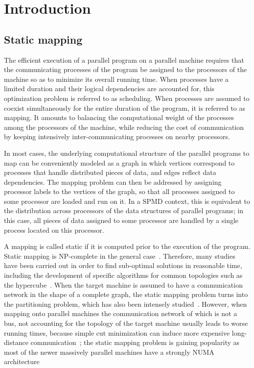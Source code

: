 
\section{Introduction}

\subsection{Static mapping}

The efficient execution of a parallel program on a parallel machine
requires that the communicating processes of the program be assigned
to the processors of the machine so as to minimize its overall running
time.
When processes have a limited duration and their logical dependencies
are accounted for, this optimization problem is referred to as
scheduling.
When processes are assumed to coexist simultaneously for the entire
duration of the program, it is referred to as mapping. It
amounts to balancing the computational weight of the processes among the
processors of the machine, while reducing the cost of communication by
keeping intensively inter-communicating processes on nearby
processors.

In most cases, the underlying computational structure of the parallel
programs to map can be conveniently modeled as a graph in which
vertices correspond to processes that handle distributed pieces of
data, and edges reflect data dependencies. The mapping problem can
then be addressed by assigning processor labels to the vertices of the
graph, so that all processes assigned to some processor are loaded and
run on it.
In a SPMD context, this is equivalent to the distribution
across processors of the data structures of parallel programs; in this
case, all pieces of data assigned to some processor are handled by a
single process located on this processor.

A mapping is called static if it is computed prior to the
execution of the program. Static mapping is NP-complete in the general
case~\cite{gajo79}. Therefore, many studies have been carried out in
order to find sub-optimal solutions in reasonable time, including
the development of specific algorithms for common topologies such
as the hypercube~\cite{errasa90,hamm92}.
When the target machine is assumed to have a communication network in
the shape of a complete graph, the static mapping problem turns into
the partitioning problem, which has also been intensely
studied~\cite{basi94,hele93a,kaku95a,kaku95c,posili90}.
However, when mapping onto parallel machines the communication network
of which is not a bus, not accounting for the topology of the target
machine usually leads to worse running times, because simple cut
minimization can induce more expensive long-distance
communication~\cite{hamm92,wacrevjo95}; the static mapping problem is
gaining popularity as most of the newer massively parallel machines
have a strongly NUMA architecture

